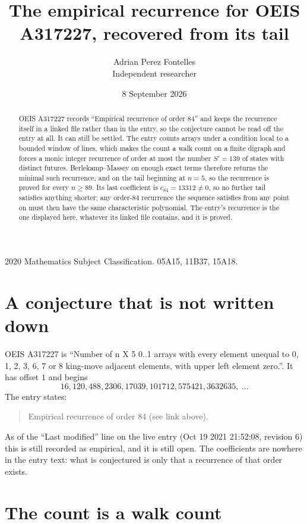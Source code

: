 \documentclass[11pt,a4paper]{article}
\title{The empirical recurrence for OEIS A317227, recovered from its tail}
\author{Adrian Perez Fontelles\\ \small Independent researcher}
\date{8 September 2026}
\theoremstyle{plain}
\theoremstyle{definition}
\begin{document}
\maketitle

\begin{abstract}
OEIS A317227 records ``Empirical recurrence of order $84$'' and keeps the recurrence itself in
a linked file rather than in the entry, so the conjecture cannot be read off the entry at all.
It can still be settled. The entry counts arrays under a condition local to a bounded window of
lines, which makes the count a walk count on a finite digraph and forces a monic integer
recurrence of order at most the number $S'=139$ of states with distinct futures. Berlekamp--Massey on
enough exact terms therefore returns the minimal such recurrence, and on the tail beginning at $n=5$, so the recurrence is proved for every $n\ge89$.
Its last coefficient is $c_{84}=13312\neq0$, so no further tail satisfies anything
shorter; any order-$84$ recurrence the sequence satisfies from any point on must then have
the same characteristic polynomial. The entry's recurrence is the one displayed here, whatever
its linked file contains, and it is proved.
\end{abstract}

\noindent\small 2020 Mathematics Subject Classification. 05A15, 11B37, 15A18.\normalsize

\section{A conjecture that is not written down}

OEIS A317227 is ``Number of n X 5 0..1 arrays with every element unequal to 0, 1, 2, 3, 6, 7 or 8 king-move adjacent elements, with upper left element zero.''. It has offset $1$ and begins
\[
16, 120, 488, 2306, 17039, 101712, 575421, 3632635,\ \dots
\]
The entry states:
\begin{quote}
Empirical recurrence of order 84 (see link above).
\end{quote}
As of the ``Last modified'' line on the live entry (Oct 19 2021 21:52:08, revision 6)
this is still recorded as empirical, and it is still open. The coefficients are nowhere in the
entry text: what is conjectured is only that a recurrence of that order exists.

\section{The count is a walk count}
\end{document}
